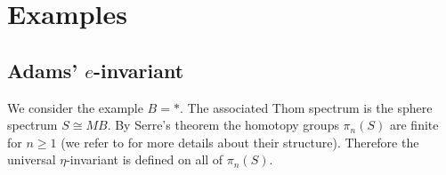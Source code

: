 \documentclass[12pt]{article}
\begin{document}
\section{Examples}\label{sect5}

\subsection{Adams' $e$-invariant}\label{subsec51}


We consider the example $B=*$. The associated Thom spectrum is the sphere spectrum $S\cong MB$.
By Serre's theorem \cite{MR0059548} the homotopy groups $\pi_{n}(S)$ are finite for $n\ge 1$ (we refer to  \cite{MR860042} for more details about their structure). 
Therefore the universal $\eta$-invariant is defined on all of $\pi_{n}(S)$.




\end{document}
